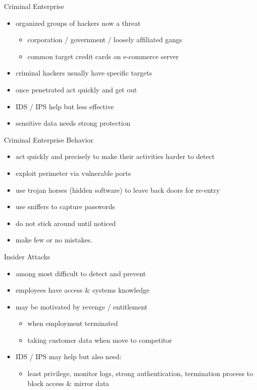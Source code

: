 \documentclass{beamer}
\begin{document}
\begin{frame}{Criminal Enterprise}
  \begin{itemize}
  \item \alert{organized} groups of hackers now a threat
    \begin{itemize}
    \item corporation / government / loosely afﬁliated gangs
    \item common target credit cards on e-commerce server
    \end{itemize}
  \item criminal hackers usually have speciﬁc targets
  \item once penetrated act quickly and get out
  \item IDS / IPS help but less effective 
  \item sensitive data needs strong protection
  \end{itemize}
\end{frame}

\begin{frame}{Criminal Enterprise Behavior}
  \begin{itemize}
  \item act quickly and precisely to make their activities 
    harder to detect
  \item exploit perimeter via vulnerable ports
  \item use trojan horses (hidden software) to leave 
    back doors for re-entry
  \item use sniffers to capture passwords
  \item do not stick around until noticed
  \item make few or no mistakes. 
  \end{itemize}
\end{frame}

\begin{frame}{Insider Attacks}
  \begin{itemize}
  \item among most difficult to detect and prevent 
  \item employees have access \& systems knowledge 
  \item may be motivated by revenge / entitlement 
      \begin{itemize}
      \item when employment terminated 
      \item taking customer data when move to competitor 
      \end{itemize}
  \item IDS / IPS may help but also need: 
      \begin{itemize}
      \item least privilege, monitor logs, strong authentication, 
        termination process to block access \& mirror data 
      \end{itemize}
  \end{itemize}
\end{frame}
\end{document}
